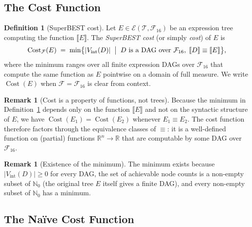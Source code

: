 \documentclass[12pt,a4paper]{article}
\theoremstyle{definition}
\newtheorem{definition}[theorem]{Definition}
\newtheorem{remark}[theorem]{Remark}
\newcommand{\Cost}{\operatorname{Cost}}
\newcommand{\Fam}{\mathcal{F}}
\begin{document}
\subsection{The Cost Function}

\begin{definition}[SuperBEST cost]
\label{def:cost}
Let $E \in \mathcal{E}(\mathcal{T},\Fam_{16})$ be an expression tree computing
the function $\llbracket E \rrbracket$.  The \emph{SuperBEST cost} (or simply
\emph{cost}) of $E$ is
\[
  \Cost_{\Fam}(E)
  \;=\;
  \min\bigl\{
    |V_{\mathrm{int}}(D)|
    \;\bigm|\;
    D \text{ is a DAG over } \Fam_{16},\;
    \llbracket D \rrbracket \equiv \llbracket E \rrbracket
  \bigr\},
\]
where the minimum ranges over all finite expression DAGs over $\Fam_{16}$ that
compute the same function as $E$ pointwise on a domain of full measure.  We
write $\Cost(E)$ when $\Fam = \Fam_{16}$ is clear from context.
\end{definition}

\begin{remark}[Cost is a property of functions, not trees]
\label{rem:cost-class}
Because the minimum in Definition~\ref{def:cost} depends only on the function
$\llbracket E \rrbracket$ and not on the syntactic structure of $E$, we have
$\Cost(E_1) = \Cost(E_2)$ whenever $E_1 \equiv E_2$.  The cost function
therefore factors through the equivalence classes of $\equiv$: it is a
well-defined function on (partial) functions $\mathbb{R}^n \to \mathbb{R}$
that are computable by some DAG over $\Fam_{16}$.
\end{remark}

\begin{remark}[Existence of the minimum]
The minimum exists because $|V_{\mathrm{int}}(D)| \geq 0$ for every DAG, the
set of achievable node counts is a non-empty subset of $\mathbb{N}_0$ (the
original tree $E$ itself gives a finite DAG), and every non-empty subset of
$\mathbb{N}_0$ has a minimum.
\end{remark}

\subsection{The Na\"{i}ve Cost Function}
\end{document}
